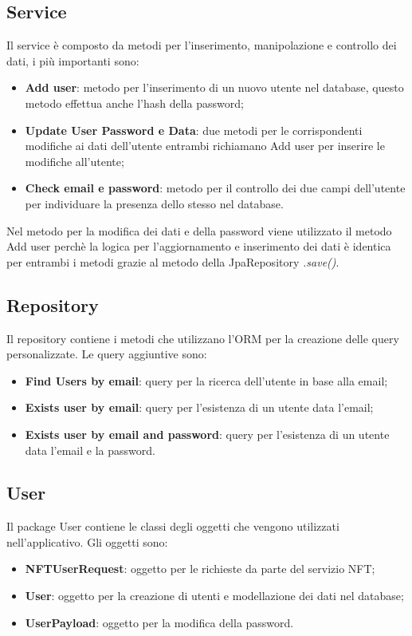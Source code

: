 \subsection{Service}
Il service è composto da metodi per l'inserimento, manipolazione e controllo dei dati, i più importanti sono:
\begin{itemize}
	\item \textbf{Add user}: metodo per l'inserimento di un nuovo utente nel database, questo metodo effettua anche l'hash della password;
	\item \textbf{Update User Password e Data}: due metodi per le corrispondenti modifiche ai dati dell'utente entrambi richiamano Add user per inserire le modifiche all'utente;
	\item \textbf{Check email e password}: metodo per il controllo dei due campi dell'utente per individuare la presenza dello stesso nel database.
\end{itemize}
Nel metodo per la modifica dei dati e della password viene utilizzato il metodo Add user perchè la logica per l'aggiornamento e inserimento dei dati è identica per entrambi i metodi grazie al metodo della JpaRepository \emph{.save()}.
\subsection{Repository}
Il repository contiene i metodi che utilizzano l'ORM per la creazione delle query personalizzate. Le query aggiuntive sono:
\begin{itemize}
	\item \textbf{Find Users by email}: query per la ricerca dell'utente in base alla email;
	\item \textbf{Exists user by email}: query per l'esistenza di un utente data l'email;
	\item \textbf{Exists user by email and password}: query per l'esistenza di un utente data l'email e la password.
\end{itemize}
\subsection{User}
Il package User contiene le classi degli oggetti che vengono utilizzati nell'applicativo. Gli oggetti sono:
\begin{itemize}
	\item \textbf{NFTUserRequest}: oggetto per le richieste da parte del servizio NFT;
	\item \textbf{User}: oggetto per la creazione di utenti e modellazione dei dati nel database;
	\item \textbf{UserPayload}: oggetto per la modifica della password.
\end{itemize}

